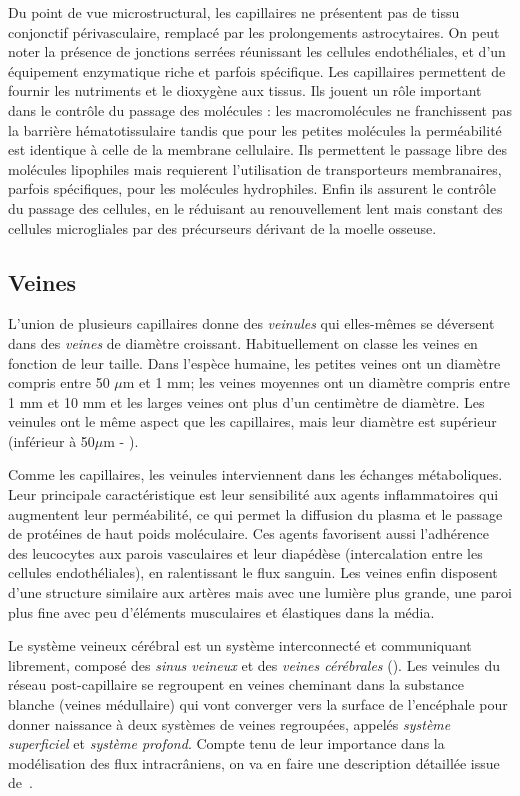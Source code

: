 Du point de vue microstructural, les capillaires ne présentent pas de tissu conjonctif périvasculaire, remplacé par les prolongements astrocytaires. On peut noter la présence de jonctions serrées réunissant les cellules endothéliales, et d’un équipement enzymatique riche et parfois spécifique. Les capillaires permettent de fournir les nutriments et le dioxygène aux tissus. Ils jouent un rôle important dans le contrôle du passage des molécules : les macromolécules ne franchissent pas la barrière hématotissulaire tandis que pour les petites molécules la perméabilité est identique à celle de la membrane cellulaire. Ils permettent le passage libre des molécules lipophiles mais requierent l’utilisation de transporteurs membranaires, parfois spécifiques, pour les molécules hydrophiles. Enfin ils assurent le contrôle du passage des cellules, en le réduisant au renouvellement lent mais constant des cellules microgliales par des précurseurs dérivant de la moelle osseuse.

\subsection{Veines}
L'union de plusieurs capillaires donne des {\em veinules} qui elles-mêmes se déversent dans des {\em veines} de diamètre croissant. Habituellement on classe les veines en fonction de leur taille. Dans l'espèce humaine, les petites veines ont un diamètre compris entre 50 $\mu$m et 1 mm; les veines moyennes ont un diamètre compris entre 1 mm et 10 mm et les larges veines ont plus d'un centimètre de diamètre. Les veinules ont le même aspect que les capillaires, mais leur diamètre est supérieur (inférieur à 50$\mu$m - \cite{Martini2009}).

Comme les capillaires, les veinules interviennent dans les échanges métaboliques. Leur principale caractéristique est leur sensibilité aux agents inflammatoires qui augmentent leur perméabilité, ce qui permet la diffusion du plasma et le passage de protéines de haut poids moléculaire. Ces agents favorisent aussi l'adhérence des leucocytes aux parois vasculaires et leur diapédèse (intercalation entre les cellules endothéliales), en ralentissant le flux sanguin. Les veines enfin disposent d’une structure similaire aux artères mais avec une lumière plus grande, une paroi plus fine avec peu d’éléments musculaires et élastiques dans la média.

Le système veineux cérébral est un système interconnecté et communiquant librement, composé des {\em sinus veineux} et des {\em veines cérébrales} (\cite{Schaller2004}). Les veinules du réseau post-capillaire se regroupent en veines cheminant dans la substance blanche (veines médullaire) qui vont converger vers la surface de l'encéphale pour donner naissance à deux systèmes de veines regroupées, appelés {\em système superficiel} et {\em système profond}. Compte tenu de leur importance dans la modélisation des flux intracr\^aniens, on va en faire une description détaillée issue de~\cite{radioanatDrainage}.


